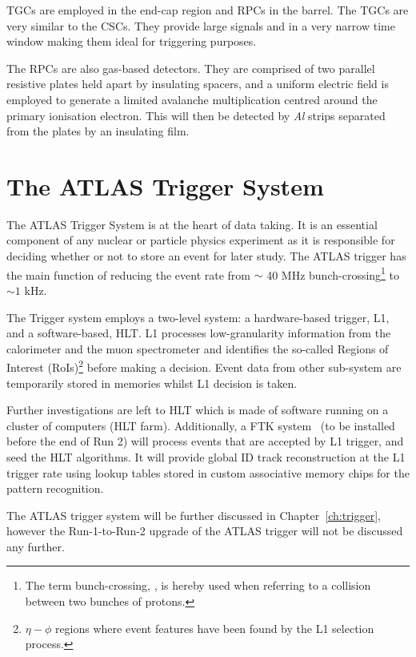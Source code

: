 			\acp{TGC} are employed in the end-cap region and \acp{RPC} in the barrel. The \acp{TGC} are very similar to the \acp{CSC}. They provide large signals and in a very narrow time window making them ideal for triggering purposes.

			The \acp{RPC} are also gas-based detectors. They are comprised of two parallel resistive plates held apart by insulating spacers, and a uniform electric field is employed to generate a limited avalanche multiplication centred around the primary ionisation electron. This will then be detected by \emph{Al} strips separated from the plates by an insulating film.




	\section{The ATLAS Trigger System}
	\label{sec:trigSyst}

		The \ac{ATLAS} Trigger System is at the heart of data taking. It is an essential component of any nuclear or particle physics experiment as it is responsible for deciding whether or not to store an event for later study. The \ac{ATLAS} trigger has the main function of reducing the event rate from $\sim$ 40 MHz bunch-crossing\footnote{The term bunch-crossing, \mubar, is hereby used when referring to a collision between two bunches of protons.} to $\sim 1$ kHz.

		The Trigger system employs a two-level system: a hardware-based trigger, \ac{L1}, and a software-based, \ac{HLT}. \ac{L1} processes low-granularity information from the calorimeter and the muon spectrometer and identifies the so-called Regions of Interest (RoIs)\footnote{$\eta - \phi$ regions where event features have been found by the \ac{L1} selection process.} before making a decision. Event data from other sub-system are temporarily stored in memories whilst \ac{L1} decision is taken.
		
		Further investigations are left to \ac{HLT} which is made of software running on a cluster of computers (\ac{HLT} farm). Additionally, a \ac{FTK} system~\cite{FTKTDR} (to be installed before the end of Run 2) will process events that are accepted by \ac{L1} trigger, and seed the \ac{HLT} algorithms. It will provide global \ac{ID} track reconstruction at the \ac{L1} trigger rate using lookup tables stored in custom associative memory chips for the pattern recognition.
		
		The \ac{ATLAS} trigger system will be further discussed in Chapter~\ref{ch:trigger}, however the Run-1-to-Run-2 upgrade of the \ac{ATLAS} trigger will not be discussed any further.